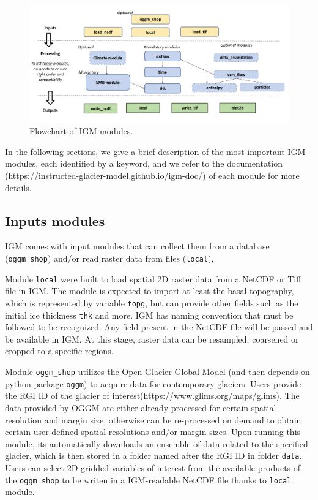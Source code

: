 \documentclass[gmd]{copernicus}
\begin{document}
\begin{figure}[!ht]
\begin{center}
\includegraphics[width=\textwidth]{fig/flowchat-module.png}
\caption{Flowchart of IGM modules. }
\label{flowchart}
\end{center}
\end{figure}

In the following sections, we give a brief description of the most important IGM modules, each identified by a keyword, and we refer to the documentation (\url{https://instructed-glacier-model.github.io/igm-doc/}) of each module for more details.

\subsection{Inputs modules}

IGM comes with input modules that can collect them from a database (\texttt{oggm\_shop}) and/or read raster data from files (\texttt{local}), 

Module \texttt{local} were built to load spatial 2D raster data from a NetCDF or Tiff file in IGM. The module is expected to import at least the basal topography, which is represented by variable \texttt{topg}, but can provide other fields such as the initial ice thickness \texttt{thk} and more. IGM has naming convention that must be followed to be recognized. Any field present in the NetCDF file will be passed and be available in IGM. At this stage, raster data can be resampled, coarsened or cropped to a specific regions.

Module \texttt{oggm\_shop} utilizes the Open Glacier Global Model \citep[OGGM][]{maussion2019open} (and then depends on python package \texttt{oggm}) to acquire data for contemporary glaciers. Users provide the RGI ID of the glacier of interest(\url{https://www.glims.org/maps/glims}). The data provided by OGGM are either already processed for certain spatial resolution and margin size, otherwise can be re-processed on demand to obtain certain user-defined spatial resolutions and/or margin sizes. Upon running this module, its automatically downloads an ensemble of data related to the specified glacier, which is then stored in a folder named after the RGI ID in folder \texttt{data}. Users can select 2D gridded variables of interest from the available products of the \texttt{oggm\_shop} to be writen in a IGM-readable NetCDF file thanks to \texttt{local} module.
\end{document}
